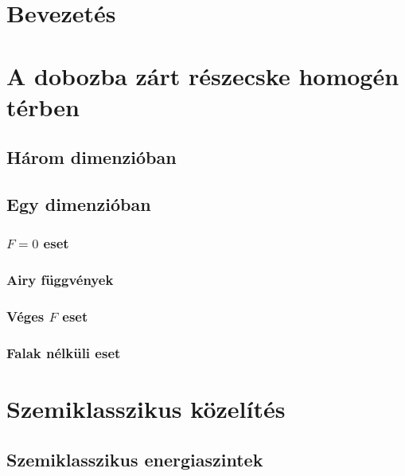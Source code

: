 \documentclass[pdftex,12pt,a4paper]{article}
\begin{document}
\addtolength{\marginparwidth}{50pt}



\newpage
{}
{}
\tableofcontents
\newpage
\listoffigures
\listoftables
\newpage
{}

\section{Bevezetés}
	
\section{A dobozba zárt részecske homogén térben}
	
	\subsection{Három dimenzióban}
		
	\subsection{Egy dimenzióban}
			
		\subsubsection{$F=0$ eset}
			
		\subsubsection{Airy függvények}
			
		\subsubsection{Véges $F$ eset}
			
		\subsubsection{Falak nélküli eset}
			
\section{Szemiklasszikus közelítés}
	
	\subsection{Szemiklasszikus energiaszintek}
		
\end{document}
